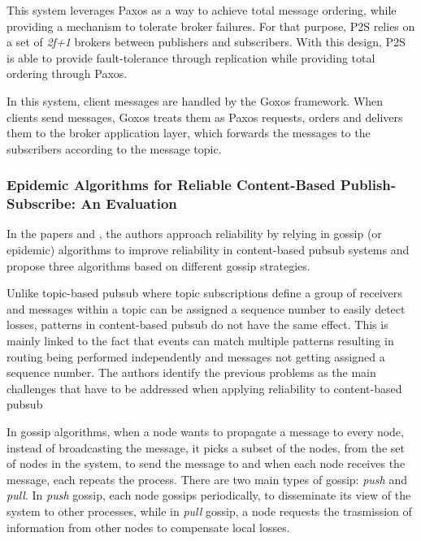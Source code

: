 This system leverages Paxos as a way to achieve total message ordering, while providing a mechanism to tolerate broker failures. For that purpose, P2S relies on a set of \textit{2f+1} brokers between publishers and subscribers. With this design, P2S is able to provide fault-tolerance through replication while providing total ordering through Paxos.

In this system, client messages are handled by the Goxos framework. When clients send messages, Goxos treats them as Paxos requests, orders and delivers them to the broker application layer, which forwards the messages to the subscribers according to the message topic.

\subsubsection{Epidemic Algorithms for Reliable Content-Based Publish-Subscribe: An Evaluation}
\label{sec:reliable_gossip}

In the papers \cite{epidemic-algs-for-pubsub} and \cite{intro-epidemic-algs-for-pubsub}, the authors approach reliability by relying in gossip (or epidemic) algorithms to improve reliability in content-based \gls{pubsub} systems and propose three algorithms based on different gossip strategies.

Unlike topic-based \gls{pubsub} where topic subscriptions define a group of receivers and messages within a topic can be assigned a sequence number to easily detect losses, patterns in content-based \gls{pubsub} do not have the same effect. This is mainly linked to the fact that events can match multiple patterns resulting in routing being performed independently and messages not getting assigned a sequence number. The authors identify the previous problems as the main challenges that have to be addressed when applying reliability to content-based \gls{pubsub}

In gossip algorithms, when a node wants to propagate a message to every node, instead of broadcasting the message, it picks a subset of the nodes, from the set of nodes in the system, to send the message to and when each node receives the message, each repeats the process. There are two main types of gossip: \textit{push} and \textit{pull}. In \textit{push} gossip, each node gossips periodically, to disseminate its view of the system to other processes, while in \textit{pull} gossip, a node requests the trasmission of information from other nodes to compensate local losses.

